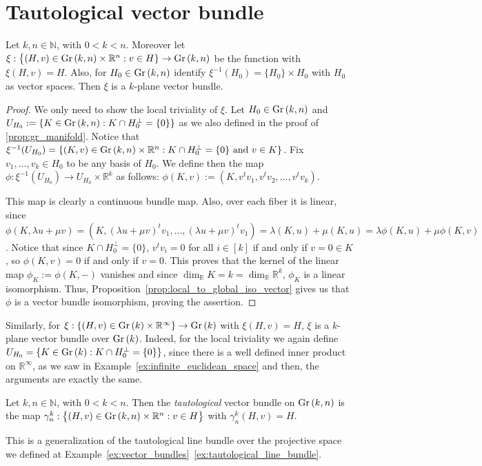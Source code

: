 \section{Tautological vector bundle}
\begin{proposition} Let $k,n\in\mathbb{N}$, with $0<k<n$. Moreover let $\xi:\big\{(H,v)\in\Gr{k}{n}\times\mathbb{R}^n:v\in H\}\to\Gr{k}{n}$ be the function with $\xi(H,v)=H$. Also, for $H_0\in\Gr{k}{n}$ identify $\xi^{-1}(H_0)=\{H_0\}\times H_0$ with $H_0$ as vector spaces. Then $\xi$ is a $k$-plane vector bundle.
\end{proposition}
\begin{proof} We only need to show the local triviality of $\xi$. Let $H_0\in\Gr{k}{n}$ and $U_{H_0}:=\{K\in\Gr{k}{n}:K\cap H_0^{\perp}=\{0\}\}$ as we also defined in the proof of \ref{prop:gr_manifold}. Notice that $\xi^{-1}(U_{H_0})=\{(K,v)\in\Gr{k}{n}\times\mathbb{R}^n:K\cap H_0^{\perp}=\{0\}\text{ and }v\in K\}$. Fix $v_1,\ldots,v_k\in H_0$ to be any basis of $H_0$. We define then the map $\phi:\xi^{-1}(U_{H_0})\to U_{H_0}\times\mathbb{R}^k$ as follows: $\phi(K,v):=(K,v^tv_1,v^tv_2,\ldots,v^tv_k)$.

This map is clearly a continuous bundle map. Also, over each fiber it is linear, since $\phi(K,\lambda u+\mu v)=(K,(\lambda u+\mu v)^tv_1,\ldots,(\lambda u+\mu v)^tv_1)=\lambda(K,u)+\mu(K,u)=\lambda\phi(K,u)+\mu\phi(K,v)$. Notice that since $K\cap H_0^{\perp}=\{0\}$, $v^tv_i=0$ for all $i\in[k]$ if and only if $v=0\in K$, so $\phi(K,v)=0$ if and only if $v=0$. This proves that the kernel of the linear map $\phi_K:=\phi(K,-)$ vanishes and since $\dim_{\mathbb{R}}K=k=\dim_{\mathbb{R}}\mathbb{R}^k$, $\phi_K$ is a linear isomorphism. Thus, Proposition~\ref{prop:local_to_global_iso_vector} gives us that $\phi$ is a vector bundle isomorphism, proving the assertion.
\end{proof}
\begin{remark} Similarly, for $\xi:\{(H,v)\in\Gr{k}\times\mathbb{R}^{\infty}\}\to\Gr{k}$ with $\xi(H,v)=H$, $\xi$ is a $k$-plane vector bundle over $\Gr{k}$. Indeed, for the local triviality we again define $U_{H_0}=\{K\in\Gr{k}:K\cap H_0^{\perp}=\{0\}\}$, since there is a well defined inner product on $\mathbb{R}^{\infty}$, as we saw in Example~\ref{ex:infinite_euclidean_space} and then, the arguments are exactly the same.
\end{remark}

\begin{definition} Let $k,n\in\mathbb{N}$, with $0<k<n$. Then the \emph{tautological} vector bundle on $\Gr{k}{n}$ is the map $\gamma_n^k:\big\{(H,v)\in\Gr{k}{n}\times\mathbb{R}^n:v\in H\big\}$ with $\gamma_n^k(H,v)=H$.
\end{definition}
\begin{remark} This is a generalization of the tautological line bundle over the projective space we defined at Example~\ref{ex:vector_bundles}~\!\ref{ex:tautological_line_bundle}.
\end{remark}

